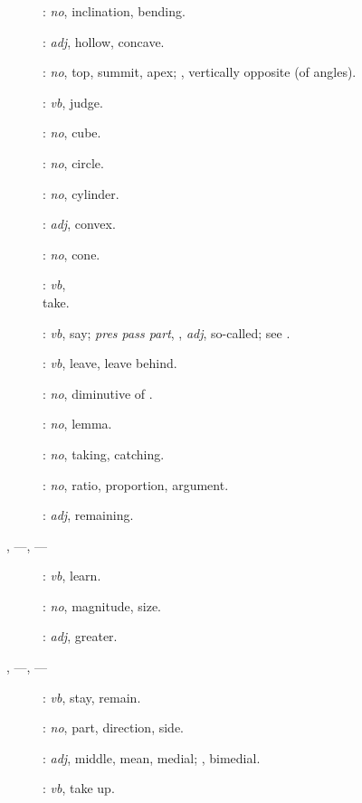 {\begin{description}
\item[]: {\em no}, inclination, bending.
\item[]: {\em adj}, hollow, concave.
\item[]: {\em no}, top, summit, apex; ,
vertically opposite (of angles).
\item[]:
{\em vb}, judge.
\item[]: {\em no}, cube.
\item[]: {\em no}, circle.
\item[]: {\em no}, cylinder.
\item[]: {\em adj}, convex.
\item[]: {\em no}, cone.
\item[]:
{\em vb},\\ take. 
\item[]: {\em vb}, say; {\em pres pass part},
, {\em adj}, so-called; see .
\item[]: {\em vb}, leave, leave behind.
\item[]: {\em no}, diminutive of .
\item[]: {\em no}, lemma.
\item[]: {\em no}, taking, catching.
\item[]: {\em no}, ratio, proportion, argument.
\item[]: {\em adj}, remaining.
\item[, ---, ---]:  {\em vb}, learn.
\item[]: {\em no}, magnitude, size.
\item[]: {\em adj}, greater.
\item[, ---, ---]: {\em vb}, stay,
remain.
\item[]: {\em no}, part, direction, side.
\item[]: {\em adj}, middle, mean, medial; , bimedial.
\item[]: {\em vb}, take up.

\end{description}}
